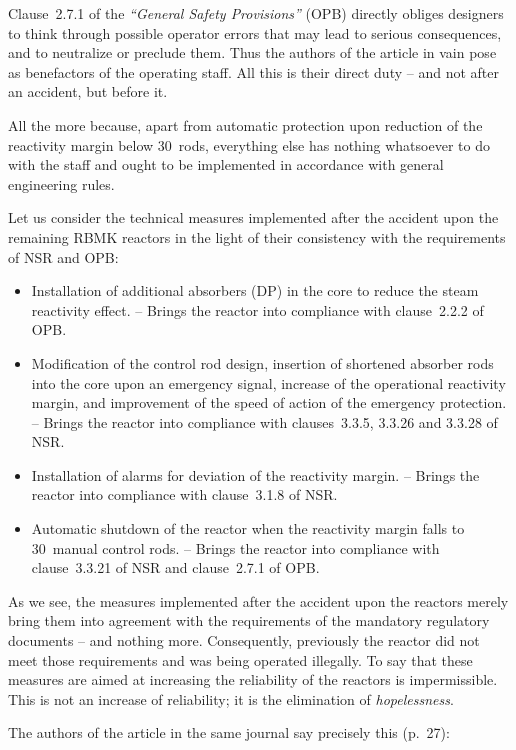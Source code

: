 \documentclass[openright]{bookest}
\begin{document}
Clause~2.7.1 of the \textit{``General Safety Provisions''} (OPB) directly obliges designers to think through possible operator errors that may lead to serious consequences, and to neutralize or preclude them. Thus the authors of the article in vain pose as benefactors of the operating staff. All this is their direct duty -- and not after an accident, but before it.

All the more because, apart from automatic protection upon reduction of the reactivity margin below \num{30}~rods, everything else has nothing whatsoever to do with the staff and ought to be implemented in accordance with general engineering rules.

Let us consider the technical measures implemented after the accident upon the remaining RBMK reactors in the light of their consistency with the requirements of NSR and OPB:

\begin{itemize}
\item Installation of additional absorbers (DP) in the core to reduce the steam reactivity effect. -- Brings the reactor into compliance with clause~2.2.2 of OPB.
\item Modification of the control rod design, insertion of shortened absorber rods into the core upon an emergency signal, increase of the operational reactivity margin, and improvement of the speed of action of the emergency protection. -- Brings the reactor into compliance with clauses~3.3.5, 3.3.26 and 3.3.28 of NSR.
\item Installation of alarms for deviation of the reactivity margin. -- Brings the reactor into compliance with clause~3.1.8 of NSR.
\item Automatic shutdown of the reactor when the reactivity margin falls to \num{30}~manual control rods. -- Brings the reactor into compliance with clause~3.3.21 of NSR and clause~2.7.1 of OPB.
\end{itemize}

As we see, the measures implemented after the accident upon the reactors merely bring them into agreement with the requirements of the mandatory regulatory documents -- and nothing more. Consequently, previously the reactor did not meet those requirements and was being operated illegally. To say that these measures are aimed at increasing the reliability of the reactors is impermissible. This is not an increase of reliability; it is the elimination of \textit{hopelessness}.

The authors of the article in the same journal say precisely this (p.~27):
\end{document}
